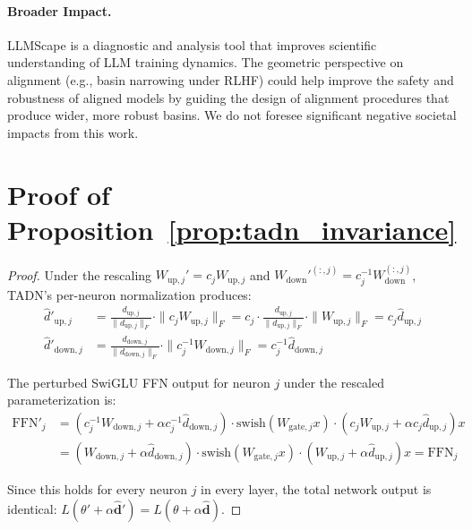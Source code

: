 \documentclass{article}
\begin{document}
\paragraph{Broader Impact.}
LLMScape is a diagnostic and analysis tool that improves scientific understanding of LLM training dynamics. The geometric perspective on alignment (e.g., basin narrowing under RLHF) could help improve the safety and robustness of aligned models by guiding the design of alignment procedures that produce wider, more robust basins. We do not foresee significant negative societal impacts from this work.





\newpage
\appendix

\section{Proof of Proposition~\ref{prop:tadn_invariance}}
\label{app:proof_tadn}

\begin{proof}
Under the rescaling $W_{\mathrm{up},j}' = c_j W_{\mathrm{up},j}$ and $W_{\mathrm{down}}'^{(:,j)} = c_j^{-1} W_{\mathrm{down}}^{(:,j)}$, TADN's per-neuron normalization produces:
\begin{align}
\hat{d}'_{\mathrm{up},j} &= \frac{d_{\mathrm{up},j}}{\|d_{\mathrm{up},j}\|_F} \cdot \|c_j W_{\mathrm{up},j}\|_F = c_j \cdot \frac{d_{\mathrm{up},j}}{\|d_{\mathrm{up},j}\|_F} \cdot \|W_{\mathrm{up},j}\|_F = c_j \hat{d}_{\mathrm{up},j} \\
\hat{d}'_{\mathrm{down},j} &= \frac{d_{\mathrm{down},j}}{\|d_{\mathrm{down},j}\|_F} \cdot \|c_j^{-1} W_{\mathrm{down},j}\|_F = c_j^{-1} \hat{d}_{\mathrm{down},j}
\end{align}

The perturbed SwiGLU FFN output for neuron $j$ under the rescaled parameterization is:
\begin{align}
\mathrm{FFN}'_j &= (c_j^{-1} W_{\mathrm{down},j} + \alpha c_j^{-1} \hat{d}_{\mathrm{down},j}) \cdot \mathrm{swish}(W_{\mathrm{gate},j} x) \cdot (c_j W_{\mathrm{up},j} + \alpha c_j \hat{d}_{\mathrm{up},j}) x \\
&= (W_{\mathrm{down},j} + \alpha \hat{d}_{\mathrm{down},j}) \cdot \mathrm{swish}(W_{\mathrm{gate},j} x) \cdot (W_{\mathrm{up},j} + \alpha \hat{d}_{\mathrm{up},j}) x = \mathrm{FFN}_j
\end{align}

Since this holds for every neuron $j$ in every layer, the total network output is identical: $L(\theta' + \alpha \hat{\mathbf{d}}') = L(\theta + \alpha \hat{\mathbf{d}})$.
\end{proof}
\end{document}
